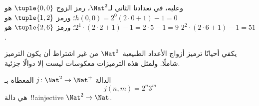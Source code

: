 \documentclass[../../../include/open-logic-section]{subfiles}
\begin{document}
\begin{explain}
وعليه، في تعدادنا الثاني لـ$\Nat^2$، رمز الزوج
$\tuple{0,0}$ هو $h(0,0) = 2^0(2\cdot 0+1) - 1 = 0$؛
ورمز $\tuple{1,2}$ هو $2^{1} \cdot (2 \cdot 2 + 1) - 1 = 2
\cdot 5 - 1 = 9$؛ ورمز $\tuple{2,6}$ هو $2^{2} \cdot (2
\cdot 6 + 1) - 1 = 51$.
\end{explain}

يكفي أحيانًا ترميز أزواج الأعداد الطبيعية~$\Nat^2$ من غير اشتراط
أن يكون الترميز شاملًا. ولمثل هذه الترميزات معكوسات ليست إلا دوالًا
جزئية.

\begin{ex}
الدالة $j\colon \Nat^2 \to \Nat^+$ المعطاة بـ
\[
j(n,m) = 2^n3^m
\]
هي دالة~!!a{injective} $\Nat^2 \to \Nat$.
\end{ex}
\end{document}

